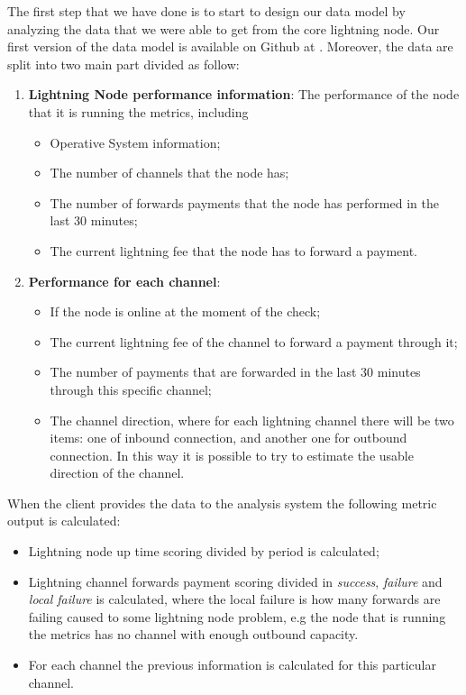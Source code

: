 The first step that we have done is to start to design our data model by analyzing
the data that we were able to get from the core lightning node. Our first version
of the data model is available on Github at \cite{lnmetrics_localreputation}. 
Moreover, the data are split into two main part divided as follow:

\begin{enumerate}
    \item {\bf Lightning Node performance information}: The performance of the node that it is running
        the metrics, including
        \begin{itemize}
           \item Operative System information;
           \item The number of channels that the node has;
           \item The number of forwards payments that the node has performed in the 
               last 30 minutes;
           \item The current lightning fee that the node has to 
               forward a payment.
        \end{itemize}
    \item {\bf Performance for each channel}:
    \begin{itemize}
        \item If the node is online at the moment of the check;
        \item The current lightning fee of the channel to forward a payment through it;
        \item The number of payments that are forwarded in the last 30 minutes through this specific 
            channel;
        \item The channel direction, where for each lightning channel there will be two items: one of 
            inbound connection, and another one for outbound connection. In this way it is possible to 
            try to estimate the usable direction of the channel.
    \end{itemize}
\end{enumerate}

When the client provides the data to the analysis system the following metric output is calculated:

\begin{itemize}
    \item Lightning node up time scoring divided by period is calculated;
    \item Lightning channel forwards payment scoring divided in \emph{success}, \emph{failure} and \emph{local failure}
        is calculated, where the local failure is how many forwards are failing caused to some lightning node problem,
        e.g the node that is running the metrics has no channel with enough outbound capacity. 
    \item For each channel the previous information is calculated for this particular channel.
\end{itemize}

